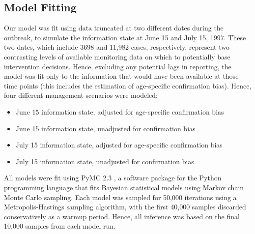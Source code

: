 \subsection{Model Fitting}\label{model-fitting}

Our model was fit using data truncated at two different dates during the outbreak, to simulate the information state at June 15 and July 15, 1997. These two dates, which include 3698 and 11,982 cases, respectively, represent two contrasting levels of available monitoring data on which to potentially base intervention decisions. Hence, excluding any potential lags in reporting, the model was fit only to the information that would have been available at those time points (this includes the estimation of age-specific confirmation bias). Hence, four different management scenarios were modeled:

\begin{itemize}
\item June 15 information state, adjusted for age-specific confirmation bias
\item June 15 information state, unadjusted for confirmation bias
\item July 15 information state, adjusted for age-specific confirmation bias
\item July 15 information state, unadjusted for confirmation bias
\end{itemize}

All models were fit using PyMC 2.3 \cite{Patil_2010}, a software package for the Python programming language that fits
Bayesian statistical models using Markov chain Monte Carlo \citep[MCMC]{Geyer_2011} sampling. Each model was sampled for 50,000 iterations using a Metropolis-Hastings sampling algorithm, with the first 40,000 samples discarded conservatively as a warmup period. Hence, all inference was based on the final 10,000 samples from each model run.